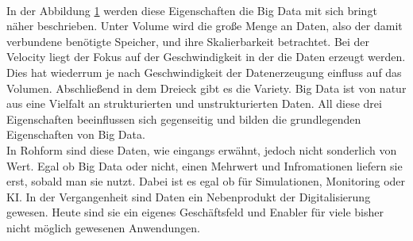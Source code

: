 \begin{onehalfspace}
\begin{figure}[h]
            \label{fig:3VRule}
        \end{figure}
        \\
        In der Abbildung \ref*{fig:3VRule} werden diese Eigenschaften die Big Data mit sich bringt näher beschrieben. Unter \glqq{}Volume\grqq{} wird die große Menge an Daten, also der damit verbundene benötigte Speicher, und ihre Skalierbarkeit betrachtet. Bei der \glqq{}Velocity\grqq{} liegt der Fokus auf der Geschwindigkeit in der die Daten erzeugt werden. Dies hat wiederrum je nach Geschwindigkeit der Datenerzeugung einfluss auf das Volumen. Abschließend in dem Dreieck gibt es die \glqq{}Variety\grqq{}. Big Data ist von natur aus eine Vielfalt an strukturierten und unstrukturierten Daten. All diese drei Eigenschaften beeinflussen sich gegenseitig und bilden die grundlegenden Eigenschaften von Big Data.
        \\
        In Rohform sind diese Daten, wie eingangs erwähnt, jedoch nicht sonderlich von Wert. Egal ob Big Data oder nicht, einen Mehrwert und Infromationen liefern sie erst, sobald man sie nutzt. Dabei ist es egal ob für Simulationen, Monitoring oder \ac{KI}. In der Vergangenheit sind Daten ein Nebenprodukt der Digitalisierung gewesen. Heute sind sie ein eigenes Geschäftsfeld und \glqq{}Enabler\grqq{} für viele bisher nicht möglich gewesenen Anwendungen.\cite{Otto2019}\cite{Gröger2021}


\end{onehalfspace}
